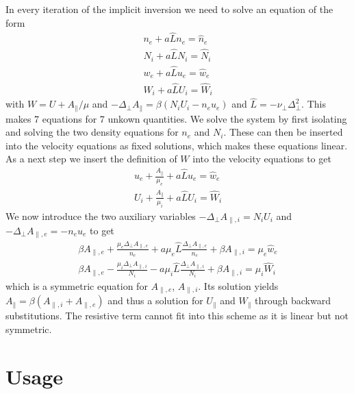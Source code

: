 In every iteration of the implicit inversion we need to solve an equation of the form
\begin{align}
    n_e + a \hat L n_e = \hat n_e \\
    N_i + a \hat L N_i = \hat N_i \\
    w_e + a \hat L u_e = \hat w_e \\
    W_i + a \hat L U_i = \hat W_i
\end{align}
with $W=U+A_\parallel/\mu$ and $-\Delta_\perp A_\parallel = \beta (N_i U_i -n_e u_e)$
    and $\hat L = -\nu_\perp \Delta_\perp^2$.
This makes 7 equations for 7 unkown quantities.
We solve the system by first isolating and solving the two density equations for $n_e$ and $N_i$. These can then be inserted into the velocity equations as
fixed solutions, which makes these equations linear. As a next step we insert  the definition of $W$ into the velocity equations to get
\begin{align}
    u_e + \frac{A_\parallel}{\mu_e} + a \hat L u_e = \hat w_e \\
    U_i + \frac{A_\parallel}{\mu_i} + a \hat L U_i = \hat W_i
\end{align}
We now introduce the two auxiliary variables $-\Delta_\perp A_{\parallel,i} = N_i U_i$ and $-\Delta_\perp A_{\parallel,e} =  -n_e u_e$ to get
\begin{align}
\beta A_{\parallel,e} + \frac{\mu_e \Delta_\perp A_{\parallel,e}}{n_e}
+ a \mu_e \hat L \frac{\Delta_\perp
        A_{\parallel,e}}{ n_e} + \beta A_{\parallel,i} =  \mu_e \hat w_e \\
        \beta A_{\parallel,e} -\frac{\mu_i \Delta_\perp A_{\parallel,i}}{N_i}
         - a \mu_i \hat L \frac{\Delta_\perp
        A_{\parallel,i}}{ N_i}+ \beta A_{\parallel,i} = \mu_i \hat W_i
\end{align}
which is a symmetric equation for $A_{\parallel,e}$, $A_{\parallel,i}$.
Its solution yields $A_\parallel = \beta(A_{\parallel,i}+A_{\parallel,e})$ and thus a solution for $U_\parallel$ and $W_\parallel$ through backward substitutions.
The resistive term cannot fit into this scheme as it is linear but not symmetric.
\section{Usage}

